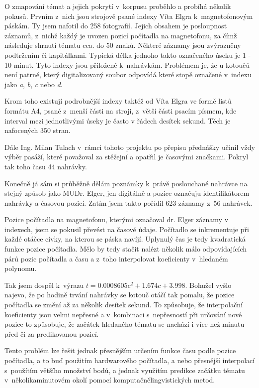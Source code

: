 O zmapování témat a jejich pokrytí v~korpusu proběhlo a probíhá několik pokusů.
Prvním z~nich jsou strojově psané indexy Víta Elgra k~magnetofonovým
páskám. Ty jsem nafotil do 258 fotografií. Jejich obsahem je posloupnost
záznamů, z~nichž každý je uvozen pozicí počítadla na magnetofonu, za čímž
následuje shrnutí tématu cca. do 50 znaků. Některé záznamy jsou zvýrazněny
podtržením či kapitálkami. Typická délka jednoho takto označeného úseku je 1 -
10 minut. Tyto indexy jsou přiložené k~nahrávkám. Problémem je, že u kotoučů
není patrné, který digitalizovaný soubor odpovídá které stopě označené v~indexu
jako {\em a}, {\em b}, {\em c} nebo {\em d}.

Krom toho existují podrobnější indexy taktéž od Víta Elgra ve formě listů
formátu A4, psané z~menší části na stroji, z~větší části psacím písmem, kde
interval mezi jednotlivými úseky je často v řádech desítek sekund. Těch je
nafocených 350 stran.

Dále Ing. Milan Tulach v~rámci tohoto projektu po přepisu přednášky učinil vždy
výběr pasáží, které považoval za stěžejní a opatřil je časovými značkami. Pokryl
tak toho času 44 nahrávky.

Konečně já sám si průběžně dělám poznámky k~právě poslouchané nahrávce na stejný
způsob jako MUDr. Elger, jen digitálně a pozice označuju identifikátorem
nahrávky a časovou pozicí. Zatím jsem takto pořídil 623 záznamy z~56 nahrávek.

Pozice počítadla na magnetofonu, kterými označoval dr. Elger záznamy v indexech,
jsem se pokusil převést na časové údaje. Počítadlo se inkrementuje při každé
otáčce cívky, na kterou se páska navíjí. Uplynulý čas je tedy kvadratická funkce
pozice počítadla. Mělo by tedy stačit nalézt několik málo odpovídajících párů
pozic počítadla a času a z~toho interpolovat koeficienty v~hledaném polynomu.

Tak jsem dospěl k~výrazu $t = 0.0008605c^2 + 1.674c + 3.998$. Bohužel vyšlo
najevo, že po hodině trvání nahrávky se kotouč otáčí tak pomalu, že pozice
počítadla se změní až za několik desítek sekund. To způsobuje, že interpolační
koeficienty jsou velmi nepřesné a v~kombinaci s~nepřesností při určování nové
pozice to způsobuje, že začátek hledaného tématu se nachází i více než minutu
před či za predikovanou pozicí.

Tento problém lze řešit jednak přesnějším určením funkce času podle pozice
počítadla, a to buď použitím hardwarového počítadla, a nebo přesnější
interpolací s~použítím většího množství bodů, a jednak využitím predikce začátku
tématu v~několikaminutovém okolí pomocí komputačnělingvistických metod.

